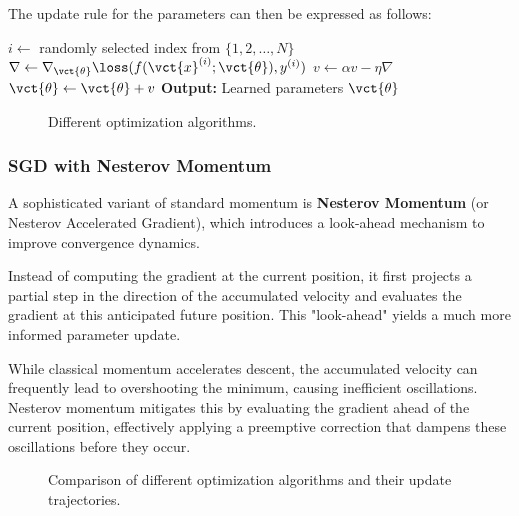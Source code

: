 The update rule for the parameters can then be expressed as follows:
\begin{algorithm}[H]
    \caption{Stochastic Gradient Descent with Momentum}
    \begin{algorithmic}[1]
            \State $i \leftarrow$ randomly selected index from $\{1, 2, \ldots, N\}$
            \State $\nabla \leftarrow \nabla_{\vct{\theta}} \loss(f(\vct{x}^{(i)}; \vct{\theta}), y^{(i)})$
            \State $v \leftarrow \alpha v - \eta \nabla$
            \State $\vct{\theta} \leftarrow \vct{\theta} + v$
        \EndWhile
        \State \textbf{Output:} Learned parameters $\vct{\theta}$
    \end{algorithmic}
\end{algorithm}

\begin{figure}[H]
    \centering
    \scalebox{0.3}{}
    \caption{Different optimization algorithms.}
\end{figure}

\subsubsection*{SGD with Nesterov Momentum}
A sophisticated variant of standard momentum is \textbf{Nesterov Momentum} (or Nesterov Accelerated Gradient), which introduces a look-ahead mechanism to improve convergence dynamics.

Instead of computing the gradient at the current position, it first projects a partial step in the direction of the accumulated velocity and evaluates the gradient at this anticipated future position. This "look-ahead" yields a much more informed parameter update.

While classical momentum accelerates descent, the accumulated velocity can frequently lead to overshooting the minimum, causing inefficient oscillations. Nesterov momentum mitigates this by evaluating the gradient ahead of the current position, effectively applying a preemptive correction that dampens these oscillations before they occur.
\begin{figure}[H]
    \centering
    \scalebox{0.7}{}
    \caption{Comparison of different optimization algorithms and their update trajectories.}
\end{figure}

